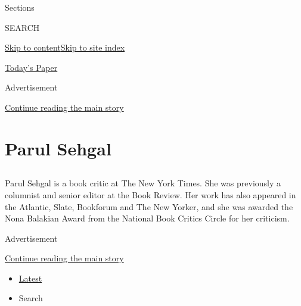 Sections

SEARCH

\protect\hyperlink{site-content}{Skip to
content}\protect\hyperlink{site-index}{Skip to site index}

\href{https://myaccount.nytimes3xbfgragh.onion/auth/login?response_type=cookie\&client_id=vi}{}

\href{https://www.nytimes3xbfgragh.onion/section/todayspaper}{Today's
Paper}

Advertisement

\protect\hyperlink{after-top}{Continue reading the main story}

\hypertarget{parul-sehgal}{%
\section{Parul Sehgal}\label{parul-sehgal}}

\subsection{}

Parul Sehgal is a book critic at The New York Times. She was previously
a columnist and senior editor at the Book Review. Her work has also
appeared in the Atlantic, Slate, Bookforum and The New Yorker, and she
was awarded the Nona Balakian Award from the National Book Critics
Circle for her criticism.

Advertisement

\protect\hyperlink{after-mid1}{Continue reading the main story}

\begin{itemize}
\tightlist
\item
  \protect\hyperlink{stream-panel}{Latest}
\item
  Search
\end{itemize}

